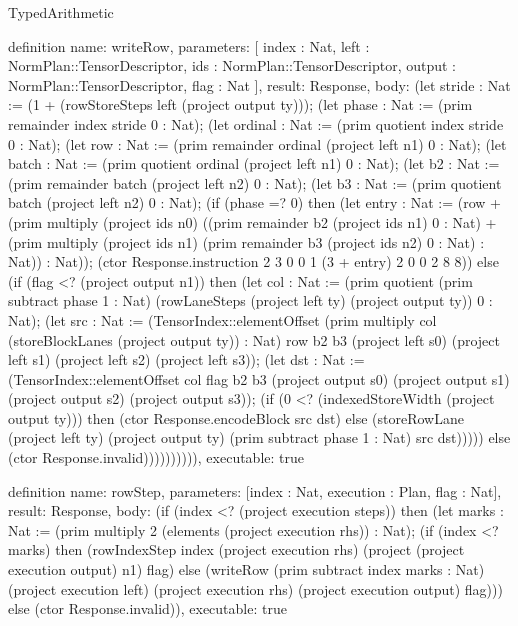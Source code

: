\begin{lexlean}{TypedArithmetic}
\begin{semanticmodule}
definition{
  name: writeRow,
  parameters: [
    index : Nat,
    left : NormPlan::TensorDescriptor,
    ids : NormPlan::TensorDescriptor,
    output : NormPlan::TensorDescriptor,
    flag : Nat
  ],
  result: Response,
  body: (let stride : Nat := (1 + (rowStoreSteps left (project output ty))); (let phase : Nat := (prim remainder index stride 0 : Nat); (let ordinal : Nat := (prim quotient index stride 0 : Nat); (let row : Nat := (prim remainder ordinal (project left n1) 0 : Nat); (let batch : Nat := (prim quotient ordinal (project left n1) 0 : Nat); (let b2 : Nat := (prim remainder batch (project left n2) 0 : Nat); (let b3 : Nat := (prim quotient batch (project left n2) 0 : Nat); (if (phase =? 0) then (let entry : Nat := (row + (prim multiply (project ids n0) ((prim remainder b2 (project ids n1) 0 : Nat) + (prim multiply (project ids n1) (prim remainder b3 (project ids n2) 0 : Nat) : Nat)) : Nat)); (ctor Response.instruction 2 3 0 0 1 (3 + entry) 2 0 0 2 8 8)) else (if (flag <? (project output n1)) then (let col : Nat := (prim quotient (prim subtract phase 1 : Nat) (rowLaneSteps (project left ty) (project output ty)) 0 : Nat); (let src : Nat := (TensorIndex::elementOffset (prim multiply col (storeBlockLanes (project output ty)) : Nat) row b2 b3 (project left s0) (project left s1) (project left s2) (project left s3)); (let dst : Nat := (TensorIndex::elementOffset col flag b2 b3 (project output s0) (project output s1) (project output s2) (project output s3)); (if (0 <? (indexedStoreWidth (project output ty))) then (ctor Response.encodeBlock src dst) else (storeRowLane (project left ty) (project output ty) (prim subtract phase 1 : Nat) src dst))))) else (ctor Response.invalid)))))))))),
  executable: true
}

definition{
  name: rowStep,
  parameters: [index : Nat, execution : Plan, flag : Nat],
  result: Response,
  body: (if (index <? (project execution steps)) then (let marks : Nat := (prim multiply 2 (elements (project execution rhs)) : Nat); (if (index <? marks) then (rowIndexStep index (project execution rhs) (project (project execution output) n1) flag) else (writeRow (prim subtract index marks : Nat) (project execution left) (project execution rhs) (project execution output) flag))) else (ctor Response.invalid)),
  executable: true
}


\end{semanticmodule}
\end{lexlean}
